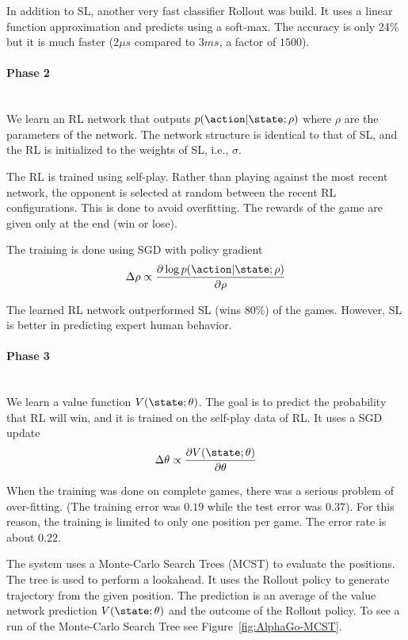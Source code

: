 In addition to SL, another very fast classifier Rollout was build.
It uses a linear function approximation and predicts using a
soft-max. The accuracy is only 24\% but it is much faster ($2\mu s$
compared to $3ms$,  a factor of $1500$).

\paragraph{Phase 2}\ \\
We learn an RL network that outputs $p(\action|\state;\rho)$ where
$\rho$ are the parameters of the network. The network structure is
identical to that of SL, and the RL is initialized to the weights of
SL, i.e., $\sigma$.

The RL is trained using self-play. Rather than playing against the
most recent network, the opponent is selected at random between the
recent RL configurations. This is done to avoid overfitting. The
rewards of the game are given only at the end (win or lose).

The training is done using SGD with policy gradient
\[
\Delta \rho \propto \frac{\partial \log
p(\action|\state;\rho)}{\partial \rho}
\]

The learned RL network outperformed SL (wins 80\%) of the games.
However, SL is better in predicting expert human behavior.

\paragraph{Phase 3}\ \\
We learn a value function $V(\state;\theta)$. The goal is to predict
the probability that RL will win, and it is trained on the self-play
data of RL. It uses a SGD update
\[
\Delta \theta \propto \frac{\partial V(\state;\theta)}{\partial
\theta}
\]

When the training was done on complete games, there was a serious
problem of over-fitting. (The training error was $0.19$ while the
test error was $0.37$). For this reason, the training is limited to
only one position per game. The error rate is about $0.22$.

The system uses a Monte-Carlo Search Trees (MCST) to evaluate the
positions. The tree is used to perform a lookahead. It uses the
Rollout policy to generate trajectory from the given position. The
prediction is an average of the value network prediction
$V(\state;\theta)$ and the outcome of the Rollout policy. To see a
run of the Monte-Carlo Search Tree see
Figure~\ref{fig:AlphaGo-MCST}.


